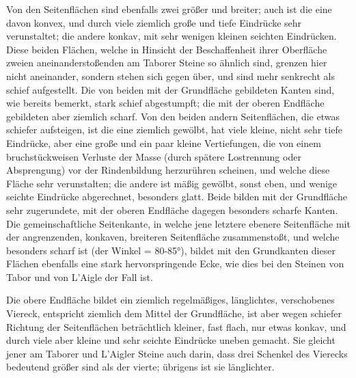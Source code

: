 \documentclass[a4paper, 11pt, oneside, german]{article}
\begin{document}
Von den Seitenflächen sind ebenfalls zwei größer und breiter; auch ist die eine davon konvex, und durch viele ziemlich große und tiefe Eindrücke sehr verunstaltet; die andere konkav, mit sehr wenigen kleinen seichten Eindrücken. Diese beiden Flächen, welche in Hinsicht der Beschaffenheit ihrer Oberfläche zweien aneinanderstoßenden am Taborer Steine so ähnlich sind, grenzen hier nicht aneinander, sondern stehen sich gegen über, und sind mehr senkrecht als schief aufgestellt. Die von beiden mit der Grundfläche gebildeten Kanten sind, wie bereits bemerkt, stark schief abgestumpft; die mit der oberen Endfläche gebildeten aber ziemlich scharf. Von den beiden andern Seitenflächen, die etwas schiefer aufsteigen, ist die eine ziemlich gewölbt, hat viele kleine, nicht sehr tiefe Eindrücke, aber eine große und ein paar kleine Vertiefungen, die von einem bruchstückweisen Verluste der Masse (durch spätere Lostrennung oder Absprengung) vor der Rindenbildung herzurühren scheinen, und welche diese Fläche sehr verunstalten; die andere ist mäßig gewölbt, sonst eben, und wenige seichte Eindrücke abgerechnet, besonders glatt. Beide bilden mit der Grundfläche sehr zugerundete, mit der oberen Endfläche dagegen besonders scharfe Kanten. Die gemeinschaftliche Seitenkante, in welche jene letztere ebenere Seitenfläche mit der angrenzenden, konkaven, breiteren Seitenfläche zusammenstoßt, und welche besonders scharf ist (der Winkel = 80-85°), bildet mit den Grundkanten dieser Flächen ebenfalls eine stark hervorspringende Ecke, wie dies bei den Steinen von Tabor und von L'Aigle der Fall ist.

Die obere Endfläche bildet ein ziemlich regelmäßiges, länglichtes, verschobenes Viereck, entspricht ziemlich dem Mittel der Grundfläche, ist aber wegen schiefer Richtung der Seitenflächen beträchtlich kleiner, fast flach, nur etwas konkav, und durch viele aber kleine und sehr seichte Eindrücke uneben gemacht. Sie gleicht jener am Taborer und L'Aigler Steine auch darin, dass drei Schenkel des Vierecks bedeutend größer sind als der vierte; übrigens ist sie länglichter.
\end{document}
